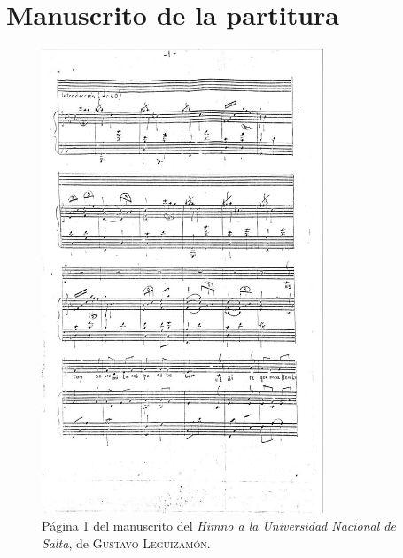 \chapter{Manuscrito de la partitura}
\label{apx:partitura}

\begin{figure}[H]
\centering
\includegraphics[width=0.75\textwidth]{img/partitura-1}
\caption{Página 1 del manuscrito del \emph{Himno a la Universidad Nacional de Salta}, de \textsc{Gustavo Leguizamón}.}
\label{fig:partitura-1}
\end{figure}

